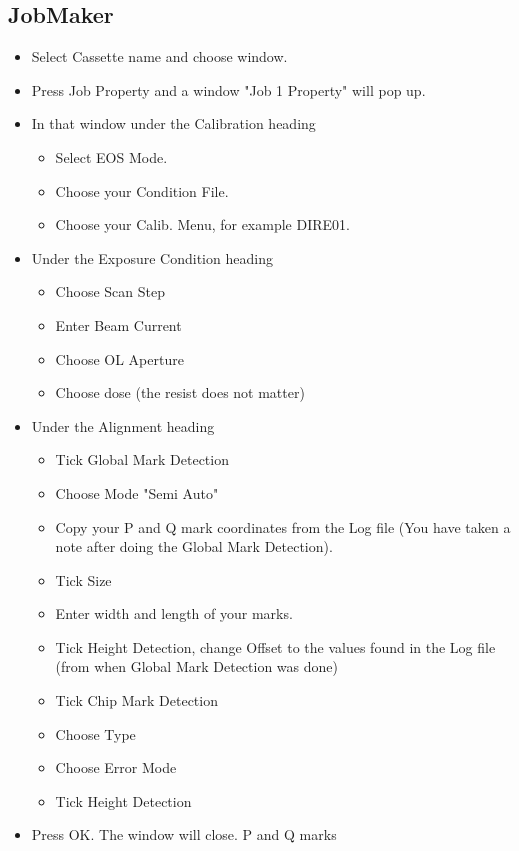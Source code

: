 \subsection{JobMaker}
\label{sec:jobmaker-1}
\begin{itemize}
\item Select  Cassette name  and choose window. %
\item Press Job  Property and a window  "Job 1 Property"
  will pop up.

\item In that window under the Calibration heading
  \begin{itemize}
  \item Select EOS Mode.
  \item Choose your Condition File.
  \item Choose your Calib. Menu, for example
    DIRE01. %
  \end{itemize}
\item Under the Exposure Condition heading
  \begin{itemize}
  \item Choose Scan Step
  \item Enter Beam Current
  \item Choose OL Aperture
  \item Choose dose (the resist does not matter)
  \end{itemize}
\item Under the Alignment heading
  \begin{itemize}
  \item Tick Global Mark Detection
  \item Choose Mode "Semi Auto"
  \item Copy your P and  Q mark coordinates from the Log
    file (You have  taken a note after  doing the Global
    Mark Detection).
  \item Tick Size
  \item Enter width and length of your marks.
  \item  Tick Height  Detection,  change  Offset to  the
    values found in the Log  file (from when Global Mark
    Detection was done)
  \item Tick Chip Mark Detection
  \item Choose Type
  \item Choose Error Mode
  \item Tick Height Detection
  \end{itemize}
\item Press  OK. The  window will close.  P and  Q marks

\end{itemize}
